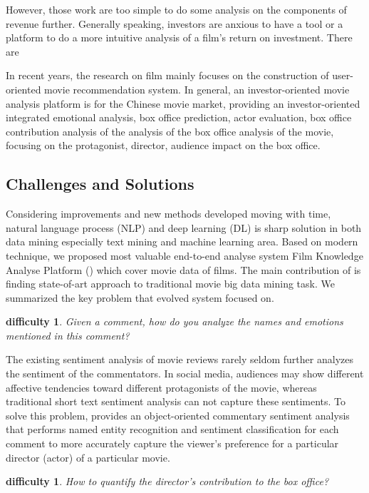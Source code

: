 However, those work are too simple to do some analysis on the components of revenue further. Generally speaking, investors are anxious to have a tool or a platform to do a more intuitive analysis of a film's return on investment. There are 
\par In recent years, the research on film mainly focuses on the construction of user-oriented movie recommendation system\cite{diao2014jointly,tang2015user}. In general, an investor-oriented movie analysis platform is for the Chinese movie market, providing an investor-oriented integrated emotional analysis, box office prediction, actor evaluation, box office contribution analysis of the analysis of the box office analysis of the movie, focusing on the protagonist, director, audience impact on the box office.
\subsection{Challenges and Solutions}
Considering improvements and new methods developed moving with time, natural language process (NLP) and deep learning (DL) is sharp solution in both data mining especially text mining and machine learning area. Based on modern technique, we proposed most valuable end-to-end analyse system Film Knowledge Analyse Platform (\system) which cover movie data of films. The main contribution of \system is finding state-of-art approach to traditional movie big data mining task. We summarized the key problem that evolved system \system focused on.
\newtheorem{difficulties}[theorem]{difficulty}
\begin{difficulties}
Given a comment, how do you analyze the names and emotions mentioned in this comment? \end{difficulties}
\par The existing sentiment analysis of movie reviews rarely seldom further analyzes the sentiment of the commentators. In social media, audiences may show different affective tendencies toward different protagonists of the movie, whereas traditional short text sentiment analysis can not capture these sentiments. To solve this problem, \system provides an object-oriented commentary sentiment analysis that performs named entity recognition and sentiment classification for each comment to more accurately capture the viewer's preference for a particular director (actor) of a particular movie.
\begin{difficulties}
How to quantify the director's contribution to the box office?
\end{difficulties}
